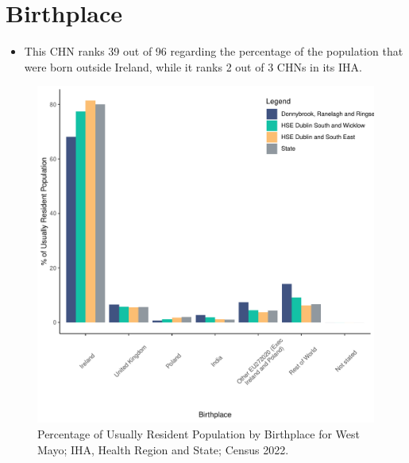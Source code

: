 \documentclass{article}
\begin{document}
\section{Birthplace}\label{sect:Birth}
\begin{itemize}
\item This CHN ranks  39 out of 96 regarding the percentage of the population that were born outside Ireland, while it ranks  2 out of 3 CHNs in its IHA.
\end{itemize}
\begin{figure}[H]
	\centering
	\includegraphics[width = 130mm]{../figures/BirthED.pdf}
	\caption{Percentage of Usually Resident Population by Birthplace for West Mayo; IHA, Health Region and State; Census 2022.}
	\label{fig:vbnv}
	\end{figure}
	
\end{document}
